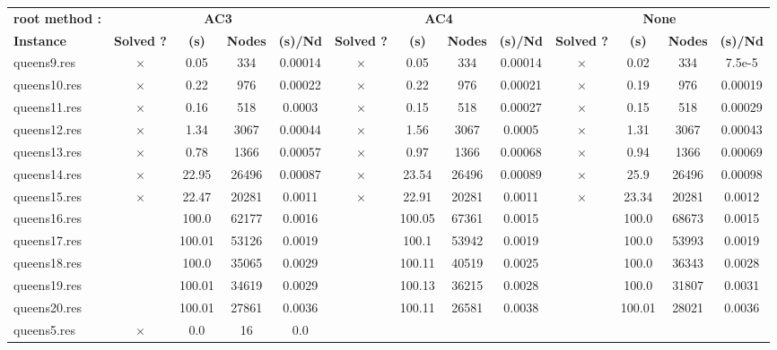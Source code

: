 \documentclass[main.tex]{subfiles}
\begin{document}
\newpage
\begin{landscape}
\begin{center}
\renewcommand{\arraystretch}{1.4} 
\begin{tabular}{|l|cccc|cccc|cccc|}
	\hline
\textbf{root method :} & \multicolumn{4}{c}{\textbf{AC3}} & \multicolumn{4}{c}{\textbf{AC4}} & \multicolumn{4}{c}{\textbf{None}}\\
\textbf{Instance}  & \textbf{Solved ?} & \textbf{(s)} & \textbf{Nodes} & \textbf{(s)/Nd} & \textbf{Solved ?} & \textbf{(s)} & \textbf{Nodes} & \textbf{(s)/Nd} & \textbf{Solved ?} & \textbf{(s)} & \textbf{Nodes} & \textbf{(s)/Nd}\\\hline

queens9.res & $\times$ & 0.05 & 334 & 0.00014
 & $\times$ & 0.05 & 334 & 0.00014
 & $\times$ & 0.02 & 334 & 7.5e-5
\\
queens10.res & $\times$ & 0.22 & 976 & 0.00022
 & $\times$ & 0.22 & 976 & 0.00021
 & $\times$ & 0.19 & 976 & 0.00019
\\
queens11.res & $\times$ & 0.16 & 518 & 0.0003
 & $\times$ & 0.15 & 518 & 0.00027
 & $\times$ & 0.15 & 518 & 0.00029
\\
queens12.res & $\times$ & 1.34 & 3067 & 0.00044
 & $\times$ & 1.56 & 3067 & 0.0005
 & $\times$ & 1.31 & 3067 & 0.00043
\\
queens13.res & $\times$ & 0.78 & 1366 & 0.00057
 & $\times$ & 0.97 & 1366 & 0.00068
 & $\times$ & 0.94 & 1366 & 0.00069
\\
queens14.res & $\times$ & 22.95 & 26496 & 0.00087
 & $\times$ & 23.54 & 26496 & 0.00089
 & $\times$ & 25.9 & 26496 & 0.00098
\\
queens15.res & $\times$ & 22.47 & 20281 & 0.0011
 & $\times$ & 22.91 & 20281 & 0.0011
 & $\times$ & 23.34 & 20281 & 0.0012
\\
queens16.res &  & 100.0 & 62177 & 0.0016
 &  & 100.05 & 67361 & 0.0015
 &  & 100.0 & 68673 & 0.0015
\\
queens17.res &  & 100.01 & 53126 & 0.0019
 &  & 100.1 & 53942 & 0.0019
 &  & 100.0 & 53993 & 0.0019
\\
queens18.res &  & 100.0 & 35065 & 0.0029
 &  & 100.11 & 40519 & 0.0025
 &  & 100.0 & 36343 & 0.0028
\\
queens19.res &  & 100.01 & 34619 & 0.0029
 &  & 100.13 & 36215 & 0.0028
 &  & 100.0 & 31807 & 0.0031
\\
queens20.res &  & 100.01 & 27861 & 0.0036
 &  & 100.11 & 26581 & 0.0038
 &  & 100.01 & 28021 & 0.0036
\\
queens5.res & $\times$ & 0.0 & 16 & 0.0

\end{tabular}
\end{center}
\end{landscape}
\end{document}
